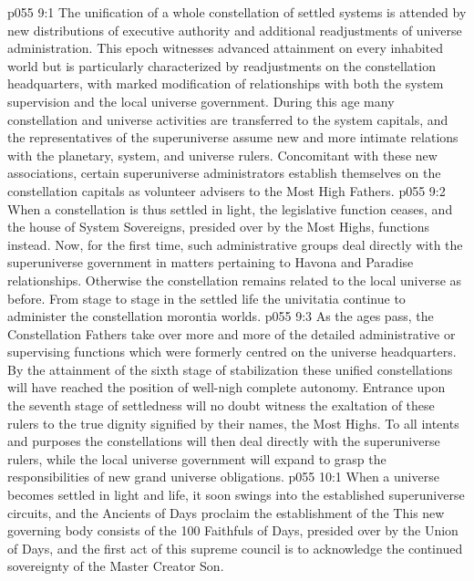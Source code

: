 \vs p055 9:1 The unification of a whole constellation of settled systems is attended by new distributions of executive authority and additional readjustments of universe administration. This epoch witnesses advanced attainment on every inhabited world but is particularly characterized by readjustments on the constellation headquarters, with marked modification of relationships with both the system supervision and the local universe government. During this age many constellation and universe activities are transferred to the system capitals, and the representatives of the superuniverse assume new and more intimate relations with the planetary, system, and universe rulers. Concomitant with these new associations, certain superuniverse administrators establish themselves on the constellation capitals as volunteer advisers to the Most High Fathers.
\vs p055 9:2 When a constellation is thus settled in light, the legislative function ceases, and the house of System Sovereigns, presided over by the Most Highs, functions instead. Now, for the first time, such administrative groups deal directly with the superuniverse government in matters pertaining to Havona and Paradise relationships. Otherwise the constellation remains related to the local universe as before. From stage to stage in the settled life the univitatia continue to administer the constellation morontia worlds.
\vs p055 9:3 As the ages pass, the Constellation Fathers take over more and more of the detailed administrative or supervising functions which were formerly centred on the universe headquarters. By the attainment of the sixth stage of stabilization these unified constellations will have reached the position of well\hyp{}nigh complete autonomy. Entrance upon the seventh stage of settledness will no doubt witness the exaltation of these rulers to the true dignity signified by their names, the Most Highs. To all intents and purposes the constellations will then deal directly with the superuniverse rulers, while the local universe government will expand to grasp the responsibilities of new grand universe obligations.
\vs p055 10:1 When a universe becomes settled in light and life, it soon swings into the established superuniverse circuits, and the Ancients of Days proclaim the establishment of the  This new governing body consists of the 100 Faithfuls of Days, presided over by the Union of Days, and the first act of this supreme council is to acknowledge the continued sovereignty of the Master Creator Son.
